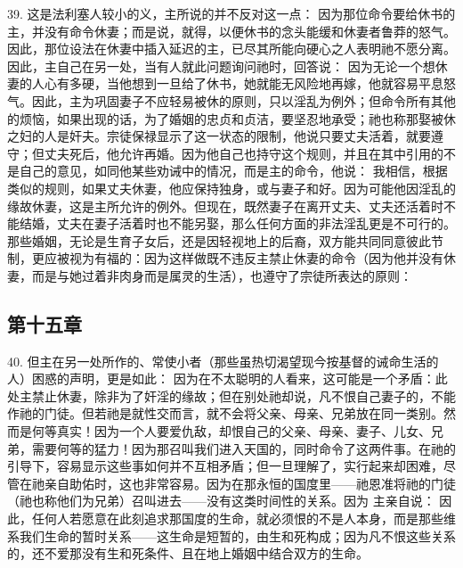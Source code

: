 39.  这是法利塞人较小的义，主所说的并不反对这一点： 因为那位命令要给休书的主，并没有命令休妻；而是说，就得，以便休书的念头能缓和休妻者鲁莽的怒气。因此，那位设法在休妻中插入延迟的主，已尽其所能向硬心之人表明祂不愿分离。因此，主自己在另一处，当有人就此问题询问祂时，回答说： 因为无论一个想休妻的人心有多硬，当他想到一旦给了休书，她就能无风险地再嫁，他就容易平息怒气。因此，主为巩固妻子不应轻易被休的原则，只以淫乱为例外；但命令所有其他的烦恼，如果出现的话，为了婚姻的忠贞和贞洁，要坚忍地承受；祂也称那娶被休之妇的人是奸夫。宗徒保禄显示了这一状态的限制，他说只要丈夫活着，就要遵守；但丈夫死后，他允许再婚。因为他自己也持守这个规则，并且在其中引用的不是自己的意见，如同他某些劝诫中的情况，而是主的命令，他说： 我相信，根据类似的规则，如果丈夫休妻，他应保持独身，或与妻子和好。因为可能他因淫乱的缘故休妻，这是主所允许的例外。但现在，既然妻子在离开丈夫、丈夫还活着时不能结婚，丈夫在妻子活着时也不能另娶，那么任何方面的非法淫乱更是不可行的。那些婚姻，无论是生育子女后，还是因轻视地上的后裔，双方能共同同意彼此节制，更应被视为有福的：因为这样做既不违反主禁止休妻的命令（因为他并没有休妻，而是与她过着非肉身而是属灵的生活），也遵守了宗徒所表达的原则：\par


\subsection{第十五章}

40. 但主在另一处所作的、常使小者（那些虽热切渴望现今按基督的诫命生活的人）困惑的声明，更是如此： 因为在不太聪明的人看来，这可能是一个矛盾：此处主禁止休妻，除非为了奸淫的缘故；但在别处祂却说，凡不恨自己妻子的，不能作祂的门徒。但若祂是就性交而言，就不会将父亲、母亲、兄弟放在同一类别。然而是何等真实！因为一个人要爱仇敌，却恨自己的父亲、母亲、妻子、儿女、兄弟，需要何等的猛力！因为那召叫我们进入天国的，同时命令了这两件事。在祂的引导下，容易显示这些事如何并不互相矛盾；但一旦理解了，实行起来却困难，尽管在祂亲自助佑时，这也非常容易。因为在那永恒的国度里——祂恩准将祂的门徒（祂也称他们为兄弟）召叫进去——没有这类时间性的关系。因为  主亲自说： 因此，任何人若愿意在此刻追求那国度的生命，就必须恨的不是人本身，而是那些维系我们生命的暂时关系——这生命是短暂的，由生和死构成；因为凡不恨这些关系的，还不爱那没有生和死条件、且在地上婚姻中结合双方的生命。\par

